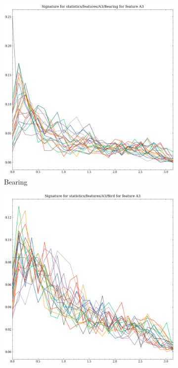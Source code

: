\begin{figure}[ht]
    \begin{subfigure}[b]{0.23\textwidth}
        \includegraphics[width=\textwidth]{assets/feature_extraction/A3/Bearing.png}
        \caption{Bearing}
        \label{fig:features-statistics-A3-e}    
    \end{subfigure}
    \hfill
    \begin{subfigure}[b]{0.23\textwidth}
        \includegraphics[width=\textwidth]{assets/feature_extraction/A3/Bird.png}

\end{subfigure}
\end{figure}
